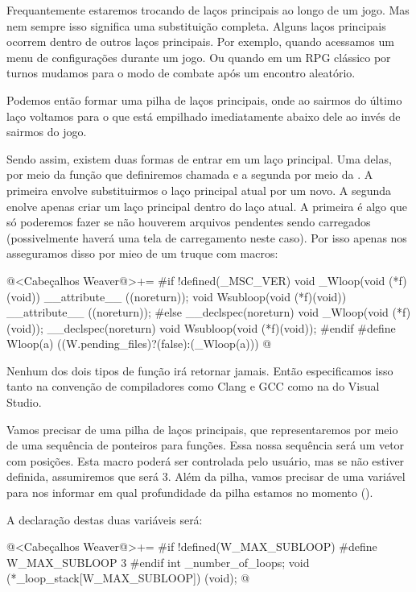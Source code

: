 
Frequantemente estaremos trocando de laços principais ao longo de um
jogo. Mas nem sempre isso significa uma substituição completa. Alguns
laços principais ocorrem dentro de outros laços principais. Por
exemplo, quando acessamos um menu de configurações durante um jogo. Ou
quando em um RPG clássico por turnos mudamos para o modo de combate
após um encontro aleatório.

Podemos então formar uma pilha de laços principais, onde ao sairmos do
último laço voltamos para o que está empilhado imediatamente abaixo
dele ao invés de sairmos do jogo.

Sendo assim, existem duas formas de entrar em um laço principal. Uma
delas, por meio da função que definiremos chamada  e
a segunda por meio da . A primeira envolve
substituirmos o laço principal atual por um novo. A segunda enolve
apenas criar um laço principal dentro do laço atual. A primeira é algo
que só poderemos fazer se não houverem arquivos pendentes sendo
carregados (possivelmente haverá uma tela de carregamento neste
caso). Por isso apenas nos asseguramos disso por mieo de um truque com
macros:

\iniciocodigo
@<Cabeçalhos Weaver@>+=
#if !defined(_MSC_VER)
void _Wloop(void (*f)(void)) __attribute__ ((noreturn));
void Wsubloop(void (*f)(void)) __attribute__ ((noreturn));
#else
__declspec(noreturn) void _Wloop(void (*f)(void));
__declspec(noreturn) void Wsubloop(void (*f)(void));
#endif
#define Wloop(a) ((W.pending_files)?(false):(_Wloop(a)))
@
\fimcodigo

Nenhum dos dois tipos de função irá retornar jamais. Então
especificamos isso tanto na convenção de compiladores como Clang e GCC
como na do Visual Studio.

Vamos precisar de uma pilha de laços principais, que representaremos
por meio de uma sequência de ponteiros para funções. Essa nossa
sequência será um vetor com 
posições. Esta macro poderá ser controlada pelo usuário, mas se não
estiver definida, assumiremos que será 3. Além da pilha, vamos
precisar de uma variável para nos informar em qual profundidade da
pilha estamos no momento ().

A declaração destas duas variáveis será:

\iniciocodigo
@<Cabeçalhos Weaver@>+=
#if !defined(W_MAX_SUBLOOP)
#define W_MAX_SUBLOOP 3
#endif
int _number_of_loops;
void (*_loop_stack[W_MAX_SUBLOOP]) (void);
@
\fimcodigo

